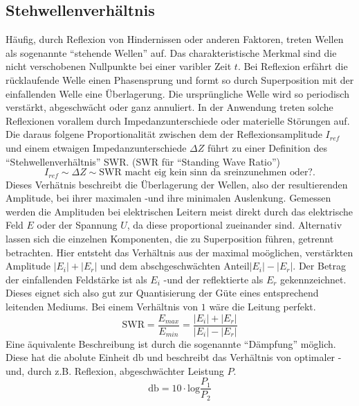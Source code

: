 \subsection{Stehwellenverhältnis}  %
Häufig, durch Reflexion von Hindernissen oder anderen Faktoren, treten Wellen als sogenannte \enquote{stehende Wellen} auf. Das charakteristische Merkmal sind die nicht verschobenen Nullpunkte bei einer varibler Zeit $t$.
Bei Reflexion erfährt die rücklaufende Welle einen Phasensprung und formt so durch Superposition mit der einfallenden Welle eine Überlagerung. Die ursprüngliche Welle wird so periodisch verstärkt, abgeschwächt oder ganz annuliert. 
In der Anwendung treten solche Reflexionen vorallem durch Impedanzunterschiede oder materielle Störungen auf. Die daraus folgene Proportionalität zwischen dem der Reflexionsamplitude $I_{ref}$ und einem etwaigen Impedanzunterschiede $\Delta Z$
führt zu einer Definition des \enquote{Stehwellenverhältnis} SWR. (SWR für \enquote{Standing Wave Ratio}) 
\begin{equation*}
    I_{ref} \sim \Delta Z \sim \text{SWR macht eig kein sinn da sreinzunehmen oder?}.
\end{equation*}
Dieses Verhätnis beschreibt die Überlagerung der Wellen, also der resultierenden Amplitude, bei ihrer maximalen -und ihre minimalen Auslenkung. 
Gemessen werden die Amplituden bei elektrischen Leitern meist direkt durch das elektrische Feld $E$ oder der Spannung $U$, da diese proportional zueinander sind.
Alternativ lassen sich die einzelnen Komponenten, die zu Superposition führen, getrennt betrachten. Hier entsteht das Verhältnis aus der maximal moöglichen, verstärkten Amplitude $|E_i| + |E_r|$ und dem abschgeschwächten Anteil$|E_i| - |E_r|$.
Der Betrag der einfallenden Feldstärke ist als $E_i$ -und der reflektierte als $E_r$ gekennzeichnet. Dieses eignet sich also gut zur Quantisierung der Güte eines entsprechend leitenden Mediums. Bei einem Verhältnis von $1$ wäre die Leitung perfekt.
\begin{equation}
    \text{SWR} = \frac{E_{max}}{E_{min}} =  \frac{|E_i| + |E_r|}{|E_i| - |E_r|}
\end{equation}
Eine äquivalente Beschreibung ist durch die sogenannte \enquote{Dämpfung} möglich. Diese hat die abolute Einheit $\si{\decibel}$ und beschreibt das Verhältnis von optimaler -und, durch z.B. Reflexion, abgeschwächter Leistung $P$. 
\begin{equation}
    \si{\decibel} = 10 \cdot \text{log} \frac{P_1}{P_2}
\end{equation}

